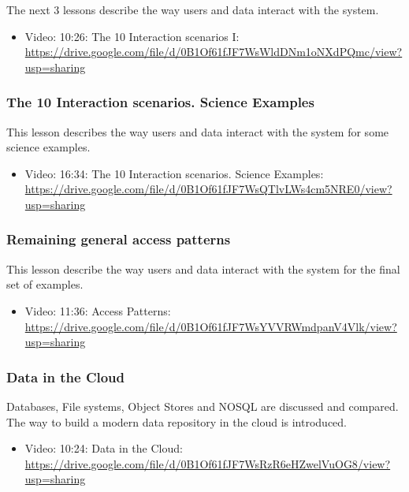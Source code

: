 The next 3 lessons describe the way users and data interact with the
system.

\begin{itemize}
\tightlist
\item
  Video: 10:26: The 10 Interaction scenarios I:
  \url{https://drive.google.com/file/d/0B1Of61fJF7WsWldDNm1oNXdPQmc/view?usp=sharing}
\end{itemize}

\subsubsection{The 10 Interaction scenarios. Science Examples}

This lesson describes the way users and data interact with the system
for some science examples.

\begin{itemize}
\tightlist
\item
  Video: 16:34: The 10 Interaction scenarios. Science Examples:
  \url{https://drive.google.com/file/d/0B1Of61fJF7WsQTlvLWs4cm5NRE0/view?usp=sharing}
\end{itemize}

\subsubsection{Remaining general access patterns}

This lesson describe the way users and data interact with the system for
the final set of examples.

\begin{itemize}
\item
  Video: 11:36: Access Patterns:
  \url{https://drive.google.com/file/d/0B1Of61fJF7WsYVVRWmdpanV4Vlk/view?usp=sharing}
\end{itemize}

\subsubsection{Data in the Cloud}\label{data-in-the-cloud}

Databases, File systems, Object Stores and NOSQL are discussed and
compared. The way to build a modern data repository in the cloud is
introduced.

\begin{itemize}
\tightlist
\item
  Video: 10:24: Data in the Cloud:
  \url{https://drive.google.com/file/d/0B1Of61fJF7WsRzR6eHZwelVuOG8/view?usp=sharing}
\end{itemize}

